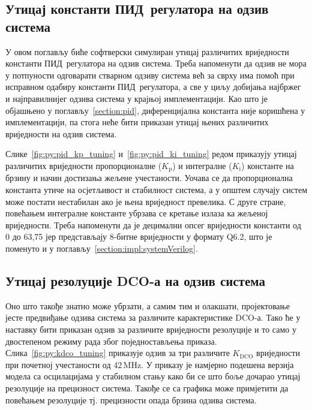 \documentclass[master]{finthesis}
\def \DCO  {DCO} %
\def \PID  {ПИД} %
\begin{document}
\subsection{Утицај константи \PID\ регулатора на одзив система} \label{section:python_model:pid_tuning}
У овом поглављу биће софтверски симулиран утицај различитих вриједности константи \PID\ регулатора на одзив система. Треба напоменути да одзив не мора у потпуности одговарати стварном одзиву система већ за сврху има помоћ при исправном одабиру константи \PID\ регулатора, а све у циљу добијања најбржег и најправилнијег одзива система у крајњој имплементацији. Као што је објашњено у поглављу~\ref{section:pid}, диференцијална константа није коришћена у имплементацији, па стога неће бити приказан утицај њених различитих вриједности на одзив система. \par


Слике~\ref{fig:py:pid_kp_tuning} и~\ref{fig:py:pid_ki_tuning} редом приказују утицај различитих вриједности пропорционалне ($K_\text{p}$) и интегралне ($K_\text{i}$) константе на брзину и начин достизања жељене учестаности. Уочава се да пропорционална константа утиче на осјетљивост и стабилност система, а у општем случају систем може постати нестабилан ако је њена вриједност превелика. С друге стране, повећањем интегралне константе убрзава се кретање излаза ка жељеној вриједности. Треба напоменути да је децимални опсег вриједности константи од 0 до 63,75 јер представљају 8-битне вриједности у формату Q6.2, што је поменуто и у поглављу~\ref{section:impl:systemVerilog}.

\subsection{Утицај резолуције \DCO-а на одзив система} \label{section:python_model:dco_tuning}
Оно што такође знатно може убрзати, а самим тим и олакшати, пројектовање јесте предвиђање одзива система за различите карактеристике \DCO-а. Тако ће у наставку бити приказан одзив за различите вриједности резолуције и то само у двостепеном режиму рада због поједностављења приказа. Слика~\ref{fig:py:kdco_tuning} приказује одзив за три различите $K_\text{DCO}$ вриједности при почетној учестаности од 42\,MHz. У приказу је намјерно подешена верзија модела са осцилацијама у стабилном стању како би се што боље дочарао утицај резолуције на прецизност система. Такође се са графика може примјетити да повећањем резолуције тј. прецизности опада брзина одзива система. 

\end{document}
